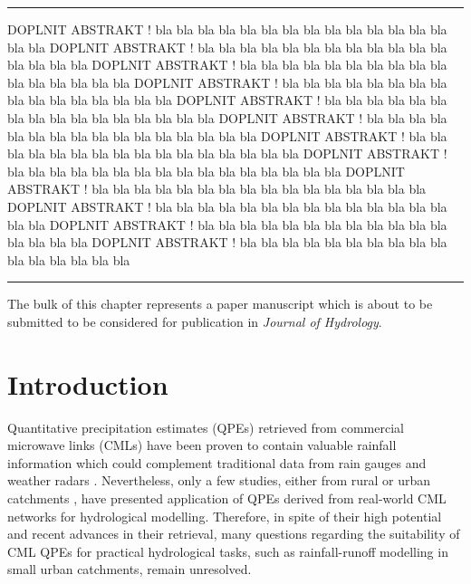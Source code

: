 \documentclass{ctuthesis}\usepackage[]{graphicx}\usepackage[]{color}
\begin{document}

\rule{\textwidth}{0.4pt}
DOPLNIT ABSTRAKT ! bla bla bla bla bla bla bla bla bla bla bla bla bla bla bla bla DOPLNIT ABSTRAKT ! bla bla bla bla bla bla bla bla bla bla bla bla bla bla bla bla DOPLNIT ABSTRAKT ! bla bla bla bla bla bla bla bla bla bla bla bla bla bla bla bla DOPLNIT ABSTRAKT ! bla bla bla bla bla bla bla bla bla bla bla bla bla bla bla bla DOPLNIT ABSTRAKT ! bla bla bla bla bla bla bla bla bla bla bla bla bla bla bla bla DOPLNIT ABSTRAKT ! bla bla bla bla bla bla bla bla bla bla bla bla bla bla bla bla DOPLNIT ABSTRAKT ! bla bla bla bla bla bla bla bla bla bla bla bla bla bla bla bla DOPLNIT ABSTRAKT ! bla bla bla bla bla bla bla bla bla bla bla bla bla bla bla bla DOPLNIT ABSTRAKT ! bla bla bla bla bla bla bla bla bla bla bla bla bla bla bla bla DOPLNIT ABSTRAKT ! bla bla bla bla bla bla bla bla bla bla bla bla bla bla bla bla DOPLNIT ABSTRAKT ! bla bla bla bla bla bla bla bla bla bla bla bla bla bla bla bla DOPLNIT ABSTRAKT ! bla bla bla bla bla bla bla bla bla bla bla bla bla bla bla bla
\newline
\rule[0.2cm]{\textwidth}{0.4pt}
{\footnotesize The bulk of this chapter represents a paper manuscript which is about to be submitted to be considered for publication in \emph{Journal of Hydrology}. }



\section{Introduction}

Quantitative precipitation estimates (QPEs) retrieved from commercial microwave links (CMLs) have been proven to contain valuable rainfall information which could complement traditional data from rain gauges and weather radars \citep{chwalaCommercialMicrowaveLink2019, imhoffRainfallNowcastingUsing2020, riosgaonaRainfallRetrievalCommercial2018, uijlenhoetOpportunisticRemoteSensing2018}. Nevertheless, only a few studies, either from rural \citep{brauerEffectDifferencesRainfall2016, cazzanigaCalculatingHydrologicalResponse2020, smiatekPotentialCommercialMicrowave2017} or urban catchments \citep{dischImpactDifferentSources2019, pastorekCommercialMicrowaveLinks2019, stranskyRunoffPredictionUsing2018}, have presented application of QPEs derived from real-world CML networks for hydrological modelling. Therefore, in spite of their high potential and recent advances in their retrieval, many questions regarding the suitability of CML QPEs for practical hydrological tasks, such as rainfall-runoff modelling in small urban catchments, remain unresolved.
\end{document}
